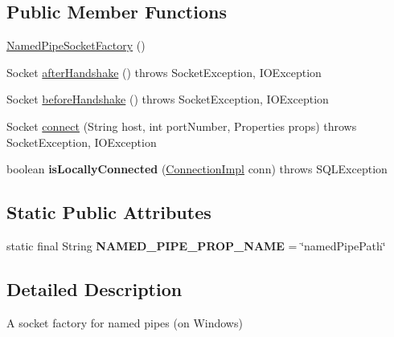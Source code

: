 \subsection*{Public Member Functions}
\begin{DoxyCompactItemize}
\item 
\mbox{\hyperlink{classcom_1_1mysql_1_1jdbc_1_1_named_pipe_socket_factory_ae89b1753f4d5fb7c7f174e35a36df90a}{Named\+Pipe\+Socket\+Factory}} ()
\item 
Socket \mbox{\hyperlink{classcom_1_1mysql_1_1jdbc_1_1_named_pipe_socket_factory_abcc02b328b87ff64d3f7e6556af8a6ce}{after\+Handshake}} ()  throws Socket\+Exception, I\+O\+Exception 
\item 
Socket \mbox{\hyperlink{classcom_1_1mysql_1_1jdbc_1_1_named_pipe_socket_factory_ad9b744457afb6727e696dc11e69c4b15}{before\+Handshake}} ()  throws Socket\+Exception, I\+O\+Exception 
\item 
Socket \mbox{\hyperlink{classcom_1_1mysql_1_1jdbc_1_1_named_pipe_socket_factory_a11fcef05ddc58b721b102fc810d12d5f}{connect}} (String host, int port\+Number, Properties props)  throws Socket\+Exception, I\+O\+Exception 
\item 
\mbox{\label{classcom_1_1mysql_1_1jdbc_1_1_named_pipe_socket_factory_ac29d4f1fb4cde00221f38af2771e0a4b}} 
boolean {\bfseries is\+Locally\+Connected} (\mbox{\hyperlink{classcom_1_1mysql_1_1jdbc_1_1_connection_impl}{Connection\+Impl}} conn)  throws S\+Q\+L\+Exception 
\end{DoxyCompactItemize}
\subsection*{Static Public Attributes}
\begin{DoxyCompactItemize}
\item 
\mbox{\label{classcom_1_1mysql_1_1jdbc_1_1_named_pipe_socket_factory_afb974096619727058a04292b3eed712f}} 
static final String {\bfseries N\+A\+M\+E\+D\+\_\+\+P\+I\+P\+E\+\_\+\+P\+R\+O\+P\+\_\+\+N\+A\+ME} = \char`\"{}named\+Pipe\+Path\char`\"{}
\end{DoxyCompactItemize}


\subsection{Detailed Description}
A socket factory for named pipes (on Windows) 

